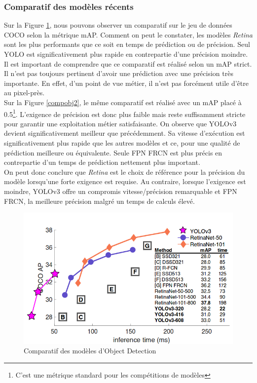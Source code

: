 \subsubsection{Comparatif des modèles récents}
Sur la Figure \ref{compobj1}, nous pouvons observer un comparatif sur le jeu de données COCO selon la métrique mAP. Comment on peut le constater, les modèles \textit{Retina} sont les plus performants que ce soit en temps de prédiction ou de précision. Seul YOLO est significativement plus rapide en contrepartie d'une précision moindre. Il est important de comprendre que ce comparatif est réalisé selon un mAP strict. Il n'est pas toujours pertinent d'avoir une prédiction avec une précision très importante. En effet, d'un point de vue métier, il n'est pas forcément utile d'être au pixel-près.\\

\noindent Sur la Figure \ref{compobj2}, le même comparatif est réalisé avec un mAP placé à 0.5\footnote{C'est une métrique standard pour les compétitions de modèles}. L'exigence de précision est donc plus faible mais reste suffisamment stricte pour garantir une exploitation métier satisfaisante. On observe que YOLOv3 devient significativement meilleur que précédemment. Sa vitesse d'exécution est significativement plus rapide que les autres modèles et ce, pour une qualité de prédiction meilleure ou équivalente. Seule FPN FRCN est plus précis en contrepartie d'un temps de prédiction nettement plus important. \\

\noindent On peut donc conclure que \textit{Retina} est le choix de référence pour la précision du modèle lorsqu'une forte exigence est requise. Au contraire, lorsque l'exigence est moindre, YOLOv3 offre un compromis vitesse/précision remarquable et FPN FRCN, la meilleure précision malgré un temps de calculs élevé.

\begin{figure}
\centering
\includegraphics[scale=0.4]{./tex/computer-vision/sota/comp3.png}
\caption{Comparatif des modèles d'Object Detection}
\label{compobj1}
\end{figure}

